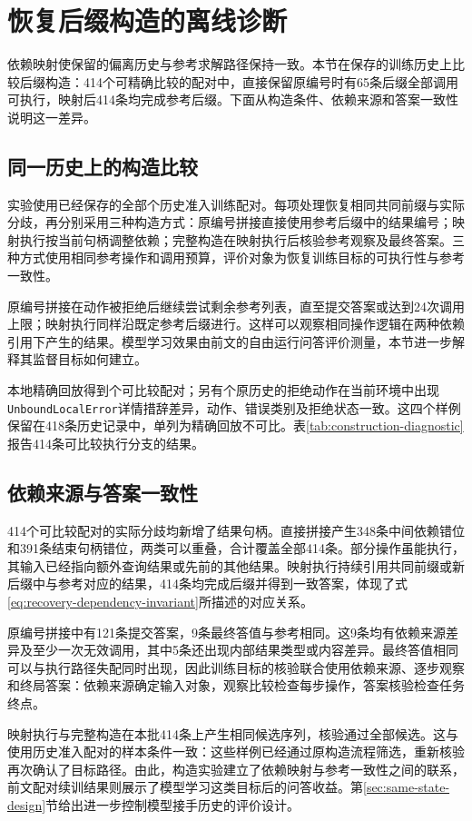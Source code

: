 \section{恢复后缀构造的离线诊断}
\label{sec:construction-diagnostic}

依赖映射使保留的偏离历史与参考求解路径保持一致。本节在保存的训练历史上比较后缀构造：414个可精确比较的配对中，直接保留原编号时有65条后缀全部调用可执行，映射后414条均完成参考后缀。下面从构造条件、依赖来源和答案一致性说明这一差异。

\subsection{同一历史上的构造比较}

实验使用已经保存的全部\LocalConstructionTotal{}个历史准入训练配对。每项处理恢复相同共同前缀与实际分歧，再分别采用三种构造方式：原编号拼接直接使用参考后缀中的结果编号；映射执行按当前句柄调整依赖；完整构造在映射执行后核验参考观察及最终答案。三种方式使用相同参考操作和调用预算，评价对象为恢复训练目标的可执行性与参考一致性。

原编号拼接在动作被拒绝后继续尝试剩余参考列表，直至提交答案或达到24次调用上限；映射执行同样沿既定参考后缀进行。这样可以观察相同操作逻辑在两种依赖引用下产生的结果。模型学习效果由前文的自由运行问答评价测量，本节进一步解释其监督目标如何建立。

本地精确回放得到\LocalConstructionCompared{}个可比较配对；另有\LocalConstructionUnavailable{}个原历史的拒绝动作在当前环境中出现\texttt{UnboundLocalError}详情措辞差异，动作、错误类别及拒绝状态一致。这四个样例保留在418条历史记录中，单列为精确回放不可比。表\ref{tab:construction-diagnostic}报告414条可比较执行分支的结果。

\begin{table}[htbp]
\centering\small
\caption{相同历史下的后缀构造结果（可比较配对414条）}
\label{tab:construction-diagnostic}
\LocalConstructionTable
\end{table}

\subsection{依赖来源与答案一致性}

414个可比较配对的实际分歧均新增了结果句柄。直接拼接产生348条中间依赖错位和391条结束句柄错位，两类可以重叠，合计覆盖全部414条。部分操作虽能执行，其输入已经指向额外查询结果或先前的其他结果。映射执行持续引用共同前缀或新后缀中与参考对应的结果，414条均完成后缀并得到一致答案，体现了式\eqref{eq:recovery-dependency-invariant}所描述的对应关系。

原编号拼接中有121条提交答案，9条最终答值与参考相同。这9条均有依赖来源差异及至少一次无效调用，其中5条还出现内部结果类型或内容差异。最终答值相同可以与执行路径失配同时出现，因此训练目标的核验联合使用依赖来源、逐步观察和终局答案：依赖来源确定输入对象，观察比较检查每步操作，答案核验检查任务终点。

映射执行与完整构造在本批414条上产生相同候选序列，核验通过全部候选。这与使用历史准入配对的样本条件一致：这些样例已经通过原构造流程筛选，重新核验再次确认了目标路径。由此，构造实验建立了依赖映射与参考一致性之间的联系，前文配对续训结果则展示了模型学习这类目标后的问答收益。第\ref{sec:same-state-design}节给出进一步控制模型接手历史的评价设计。
